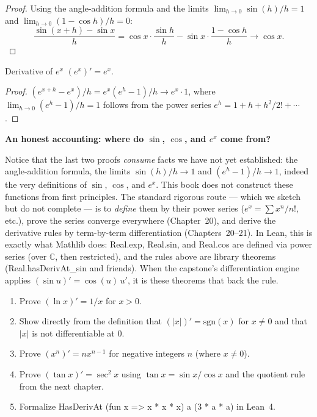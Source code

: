 \documentclass[12pt, openany]{book}
\theoremstyle{plain}
\theoremstyle{definition}
\theoremstyle{remark}
\newcommand{\li}[1]{{\ttfamily\small\color{tealaccent}#1}}
\begin{document}
\begin{proof}
Using the angle-addition formula and the limits $\lim_{h\to 0} \sin(h)/h = 1$ and $\lim_{h\to 0} (1 - \cos h)/h = 0$:
\[ \frac{\sin(x+h) - \sin x}{h} = \cos x \cdot \frac{\sin h}{h} - \sin x \cdot \frac{1 - \cos h}{h} \to \cos x. \]
\end{proof}

\begin{thmbox}{Derivative of $e^x$}
$(e^x)' = e^x$.
\end{thmbox}
\color{black}

\begin{proof}
$(e^{x+h} - e^x)/h = e^x(e^h - 1)/h \to e^x \cdot 1$, where $\lim_{h\to 0}(e^h-1)/h = 1$ follows from the power series $e^h = 1 + h + h^2/2! + \cdots$.
\end{proof}

\begin{remarkbox}
\textbf{An honest accounting: where do $\sin$, $\cos$, and $e^x$ come from?}

Notice that the last two proofs \emph{consume} facts we have not yet established: the angle-addition formula, the limits $\sin(h)/h \to 1$ and $(e^h - 1)/h \to 1$, indeed the very definitions of $\sin$, $\cos$, and $e^x$.  This book does not construct these functions from first principles.  The standard rigorous route --- which we sketch but do not complete --- is to \emph{define} them by their power series ($e^x = \sum x^n/n!$, etc.), prove the series converge everywhere (Chapter~20), and derive the derivative rules by term-by-term differentiation (Chapters~20--21).  In Lean, this is exactly what Mathlib does: \li{Real.exp}, \li{Real.sin}, and \li{Real.cos} are defined via power series (over $\mathbb{C}$, then restricted), and the rules above are library theorems (\li{Real.hasDerivAt\_sin} and friends).  When the capstone's differentiation engine applies $(\sin u)' = \cos(u)\,u'$, it is these theorems that back the rule.
\end{remarkbox}
\color{black}

\begin{exbox}
\begin{enumerate}
  \item Prove $(\ln x)' = 1/x$ for $x > 0$.
  \item Show directly from the definition that $(|x|)' = \text{sgn}(x)$ for $x \neq 0$ and that $|x|$ is not differentiable at $0$.
  \item Prove $(x^n)' = nx^{n-1}$ for negative integers $n$ (where $x \neq 0$).
  \item Prove $(\tan x)' = \sec^2 x$ using $\tan x = \sin x / \cos x$ and the quotient rule from the next chapter.
  \item Formalize \li{HasDerivAt (fun x => x * x * x) a (3 * a * a)} in Lean~4.
\end{enumerate}
\end{exbox}
\color{black}
\end{document}
